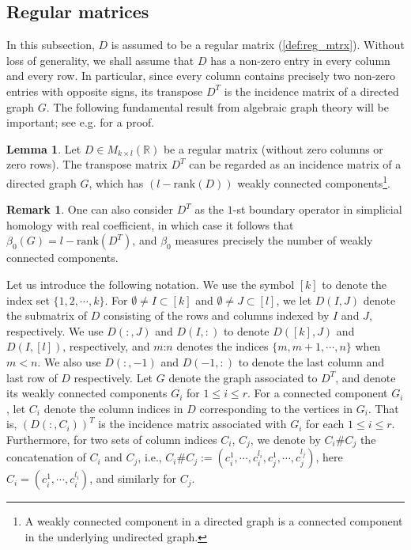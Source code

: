 \documentclass{article}
\theoremstyle{definition}
\newtheorem{remark}[theorem]{Remark}
\newtheorem{lemma}[theorem]{Lemma}
\begin{document}
%

\subsection{Regular matrices}\label{subsec:reg_mtx}
In this subsection,  $D$ is assumed to be a regular matrix (\cref{def:reg_mtrx}). Without loss of generality, we shall assume that $D$ has a non-zero entry in every column and every row. In particular, since every column contains precisely two non-zero entries with opposite signs, its transpose $D^T$ is the incidence matrix of a directed graph $G$. The following fundamental result from algebraic graph theory will be important; see e.g. \cite[Theorem 8.3.1]{MR1829620} for a proof.

\begin{lemma}\label{lemma:grph_cmpnt}
Let $D\in M_{k\times l}(\mathbb{R})$ be a regular matrix (without zero columns or zero rows). The transpose matrix $D^T$ can be regarded as an incidence matrix of a directed graph $G$,
which has $(l-\mathrm{rank}(D))$ weakly connected components\footnote{ A weakly connected component in a directed graph is a connected component in the underlying undirected graph.}.
\end{lemma}

\begin{remark}
    One can also consider $D^T$ as the $1$-st boundary operator in simplicial homology with real coefficient, in which case it follows that $\beta_0(G) = l - \mathrm{rank}(D^T)$, and $\beta_0$ measures precisely the number of weakly connected components. 
\end{remark}

Let us introduce the following notation. We use the symbol $[k]$ to denote the index set $\{1, 2, \cdots ,k\}$.
For $\emptyset\neq I\subset [k]$ and $\emptyset \neq J \subset [l]$,
we let $D(I, J)$ denote the submatrix of $D$ consisting of the rows and columns indexed by $I$ and $J$, respectively. 
We use $D(:, J)$ and $D(I, :)$ to denote $D([k], J)$ and $D(I, [l])$, respectively, 
and $m$:$n$ denotes the indices $\{m, m+1,\cdots, n\}$ when $m<n$. 
We also use $D(:, -1)$ and $D(-1, :)$ to denote the last column and last row of $D$ respectively.
Let $G$ denote the graph associated to $D^T$, and denote its weakly connected components $G_i$ for $1\leq i\leq r$. For a connected component $G_i$, let $C_i$ denote the column indices in $D$ corresponding to the vertices in $G_i$. That is, $(D(:, C_i))^T$ is the incidence matrix associated with $G_i$ for each $1\leq i\leq r$. Furthermore, for two sets of column indices $C_i$, $C_j$,
we denote by $C_i\#C_j$ the concatenation of $C_i$ and $C_j$,
i.e.,
$C_i\#C_j:=(c_i^{1}, \cdots, c_i^{l_i}, c_j^1, \cdots, c_{j}^{l_j})$,
here $C_i=(c_i^1,\cdots, c_i^{l_i})$, 
and similarly for $C_j$.
\end{document}
